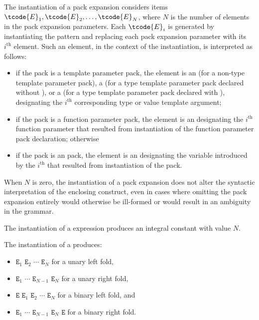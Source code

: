 \pnum
The instantiation of a pack expansion considers
items $\tcode{E}_1, \tcode{E}_2, \dotsc, \tcode{E}_N$,
where
$N$ is the number of elements in the pack expansion parameters.
Each $\tcode{E}_i$ is generated by instantiating the pattern and
replacing each pack expansion parameter with its $i^\text{th}$ element.
Such an element, in the context of the instantiation, is interpreted as
follows:
\begin{itemize}
\item
if the pack is a template parameter pack, the element is
an 
(for a non-type template parameter pack),
a 
(for a type template parameter pack declared without ), or
a 
(for a type template parameter pack declared with ),
designating the $i^\text{th}$ corresponding type or value template argument;

\item
if the pack is a function parameter pack, the element is an
designating the $i^\text{th}$ function parameter
that resulted from instantiation of
the function parameter pack declaration;
otherwise

\item
if the pack is an  pack,
the element is an 
designating the variable introduced by
the $i^\text{th}$ 
that resulted from instantiation of
the  pack.
\end{itemize}
When $N$ is zero, the instantiation of a pack expansion
does not alter the syntactic interpretation of the enclosing construct,
even in cases where omitting the pack expansion entirely would
otherwise be ill-formed or would result in an ambiguity in the grammar.

\pnum
The instantiation of a  expression produces
an integral constant with value $N$.

\pnum
The instantiation of a  produces:
\begin{itemize}
\item
\tcode{((}$\mathtt{E}_1$
            $\mathtt{E}_2$\tcode{)}
            $\cdots$\tcode{)}
            $\mathtt{E}_N$
for a unary left fold,
\item
         $\mathtt{E}_1$     
\tcode{(}$\cdots$           
\tcode{(}$\mathtt{E}_{N-1}$ 
         $\mathtt{E}_N$\tcode{))}
for a unary right fold,
\item
\tcode{(((}$\mathtt{E}$
             $\mathtt{E}_1$\tcode{)}
             $\mathtt{E}_2$\tcode{)}
             $\cdots$\tcode{)}
             $\mathtt{E}_N$
for a binary left fold, and
\item
         $\mathtt{E}_1$     
\tcode{(}$\cdots$           
\tcode{(}$\mathtt{E}_{N-1}$ 
\tcode{(}$\mathtt{E}_{N}$   
         $\mathtt{E}$\tcode{)))}
for a binary right fold.
\end{itemize}


